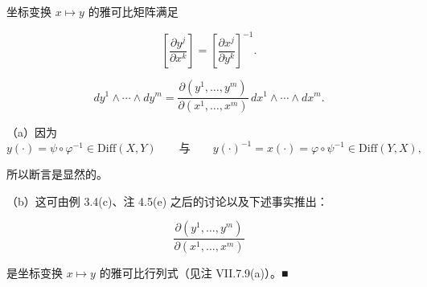 \begin{corollary}

\begin{items}
\item

坐标变换 $ x\mapsto y $ 的雅可比矩阵满足

\[
\left[\frac{\partial y^{j}}{\partial x^{k}}\right] = \left[\frac{\partial x^{j}}{\partial y^{k}}\right]^{-1} .
\]
\item
\[
dy^{1}\wedge\cdots\wedge dy^{m} = \frac{\partial(y^{1}, \ldots, y^{m})}{\partial(x^{1}, \ldots, x^{m})}\,dx^{1}\wedge\cdots\wedge dx^{m} .
\]

\proofhead
（a）因为
\[
y(\cdot) = \psi\circ\varphi^{-1}\in\mathrm{Diff}(X,Y) \qquad \text{与} \qquad y(\cdot)^{-1} = x(\cdot) = \varphi\circ\psi^{-1}\in\mathrm{Diff}(Y,X) ,
\]

所以断言是显然的。

\end{items}

（b）这可由例 3.4(c)、注 4.5(e) 之后的讨论以及下述事实推出：

\[
\frac{\partial(y^{1}, \ldots, y^{m})}{\partial(x^{1}, \ldots, x^{m})}
\]

是坐标变换 $ x\mapsto y $ 的雅可比行列式（见注 VII.7.9(a)）。\nobreak\hspace{0.35em}■

\end{corollary}

